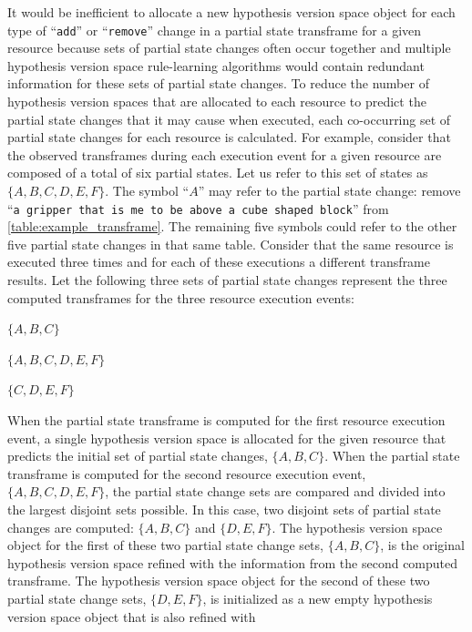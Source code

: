 It would be inefficient to allocate a new hypothesis version space
object for each type of ``{\tt{add}}'' or ``{\tt{remove}}'' change in
a partial state transframe for a given resource because sets of
partial state changes often occur together and multiple hypothesis
version space rule-learning algorithms would contain redundant
information for these sets of partial state changes.  To reduce the
number of hypothesis version spaces that are allocated to each
resource to predict the partial state changes that it may cause when
executed, each co-occurring set of partial state changes for each
resource is calculated.  For example, consider that the observed
transframes during each execution event for a given resource are
composed of a total of six partial states.  Let us refer to this set
of states as $\{A, B, C, D, E, F\}$.  The symbol ``$A$'' may refer to
the partial state change: remove ``{\tt{a gripper that is me to be
    above a cube shaped block}}'' from
{\mbox{\autoref{table:example_transframe}}}.  The remaining five
symbols could refer to the other five partial state changes in that
same table.  Consider that the same resource is executed three times
and for each of these executions a different transframe results.  Let
the following three sets of partial state changes represent the three
computed transframes for the three resource execution events:
\begin{packed_enumerate}
\item{$\{A, B, C\}$}
\item{$\{A, B, C, D, E, F\}$}
\item{$\{C, D, E, F\}$}
\end{packed_enumerate}
When the partial state transframe is computed for the first resource
execution event, a single hypothesis version space is allocated for
the given resource that predicts the initial set of partial state
changes, $\{A, B, C\}$.  When the partial state transframe is computed
for the second resource execution event, $\{A, B, C, D, E, F\}$, the
partial state change sets are compared and divided into the largest
disjoint sets possible.  In this case, two disjoint sets of partial
state changes are computed: $\{A, B, C\}$ and $\{D, E, F\}$.  The
hypothesis version space object for the first of these two partial
state change sets, $\{A, B, C\}$, is the original hypothesis version
space refined with the information from the second computed
transframe.  The hypothesis version space object for the second of
these two partial state change sets, $\{D, E, F\}$, is initialized as
a new empty hypothesis version space object that is also refined with
